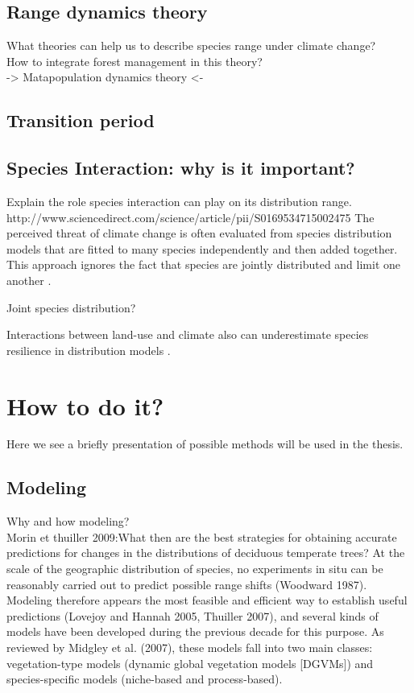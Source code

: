 \subsection*{Range dynamics theory}

What theories can help us to describe species range under climate change?\\
How to integrate forest management in this theory?\\
-> Matapopulation dynamics theory <-

\subsection*{Transition period}


\subsection*{Species Interaction: why is it important?}
Explain the role species interaction can play on its distribution range.
http://www.sciencedirect.com/science/article/pii/S0169534715002475
The perceived threat of climate change is often evaluated from species distribution models that are fitted to many species independently and then added together. This approach ignores the fact that species are jointly distributed and limit one another \citep{clark2014}.

Joint species distribution?

Interactions between land-use and climate also can underestimate species resilience in distribution models \citep{Goring2017}.

\section{How to do it?}

Here we see a briefly presentation of possible methods will be used in the thesis.

\subsection*{Modeling}

Why and how modeling?\\
Morin et thuiller 2009:{What then are the best strategies for obtaining accurate predictions for changes in the distributions of deciduous temperate trees? At the scale of the geographic distribution of species, no experiments in situ can be reasonably carried out to predict possible range shifts (Woodward 1987). Modeling therefore appears the most feasible and efficient way to establish useful predictions (Lovejoy and Hannah 2005, Thuiller 2007), and several kinds of models have been developed during the previous decade for this purpose. As reviewed by Midgley et al. (2007), these models fall into two main classes: vegetation-type models (dynamic global vegetation models [DGVMs]) and species-specific models (niche-based and process-based).}

